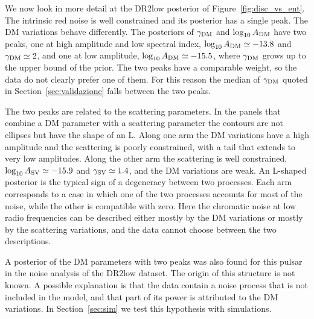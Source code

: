 We now look in more detail at the DR2low posterior of
Figure~\ref{fig:disc_vs_ent}. The intrinsic red noise is well constrained
and its posterior has a single peak. The DM variations behave differently.
The posteriors of $\gamma_{\rm DM}$ and $\log_{10}A_{\rm DM}$ have two
peaks, one at high amplitude and low spectral index,
$\log_{10}A_{\rm DM} \simeq -13.8$ and $\gamma_{\rm DM} \simeq 2$, and one
at low amplitude, $\log_{10}A_{\rm DM} \simeq -15.5$, where
$\gamma_{\rm DM}$ grows up to the upper bound of the prior. The two peaks
have a comparable weight, so the data do not clearly prefer one of them.
For this reason the median of $\gamma_{\rm DM}$ quoted in
Section~\ref{sec:validazione} falls between the two peaks.

The two peaks are related to the scattering parameters. In the panels that
combine a DM parameter with a scattering parameter the contours are not
ellipses but have the shape of an L. Along one arm the DM variations have
a high amplitude and the scattering is poorly constrained, with a tail
that extends to very low amplitudes. Along the other arm the scattering is
well constrained, $\log_{10}A_{\rm SV} \simeq -15.9$ and
$\gamma_{\rm SV} \simeq 1.4$, and the DM variations are weak. An L-shaped
posterior is the typical sign of a degeneracy between two processes. Each
arm corresponds to a case in which one of the two processes accounts for
most of the noise, while the other is compatible with zero. Here the
chromatic noise at low radio frequencies can be described either mostly
by the DM variations or mostly by the scattering variations, and the data
cannot choose between the two descriptions.

A posterior of the DM parameters with two peaks was also found for this
pulsar in the noise analysis of the DR2low dataset. The origin of this
structure is not known. A possible explanation is that the data contain a
noise process that is not included in the model, and that part of its
power is attributed to the DM variations. In Section~\ref{sec:sim} we
test this hypothesis with simulations.